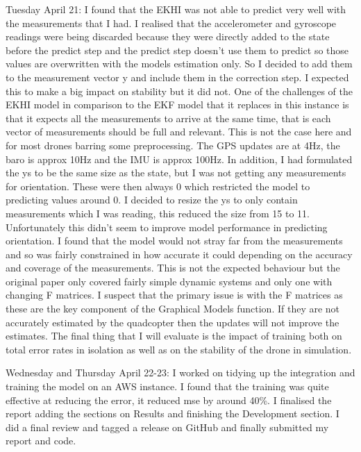 \documentclass[]{../resources/final_report}
\begin{document}
\begin{appendices}
  Tuesday April 21: I found that the EKHI was not able to predict very well with the measurements that I had. I realised that the accelerometer and gyroscope readings were being discarded because they were directly added to the state before the predict step and the predict step doesn’t use them to predict so those values are overwritten with the models estimation only. So I decided to add them to the measurement vector y and include them in the correction step. I expected this to make a big impact on stability but it did not. One of the challenges of the EKHI model in comparison to the EKF model that it replaces in this instance is that it expects all the measurements to arrive at the same time, that is each vector of measurements should be full and relevant. This is not the case here and for most drones barring some preprocessing. The GPS updates are at 4Hz, the baro is approx 10Hz and the IMU is approx 100Hz. In addition, I had formulated the ys to be the same size as the state, but I was not getting any measurements for orientation. These were then always 0 which restricted the model to predicting values around 0. I decided to resize the ys to only contain measurements which I was reading, this reduced the size from 15 to 11. Unfortunately this didn’t seem to improve model performance in predicting orientation. I found that the model would not stray far from the measurements and so was fairly constrained in how accurate it could depending on the accuracy and coverage of the measurements. This is not the expected behaviour but the original paper only covered fairly simple dynamic systems and only one with changing F matrices. I suspect that the primary issue is with the F matrices as these are the key component of the Graphical Models function. If they are not accurately estimated by the quadcopter then the updates will not improve the estimates. The final thing that I will evaluate is the impact of training both on total error rates in isolation as well as on the stability of the drone in simulation.

  Wednesday and Thursday April 22-23: I worked on tidying up the integration and training the model on an AWS instance. I found that the training was quite effective at reducing the error, it reduced mse by around 40\%. I finalised the report adding the sections on Results and finishing the Development section. I did a final review and tagged a release on GitHub and finally submitted my report and code.
  
\end{appendices}
  
\end{document}
